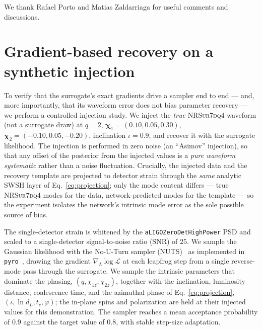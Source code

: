 \documentclass[aps,prd,twocolumn,superscriptaddress,longbibliography]{revtex4-2}
\newcommand{\NRSur}{\textsc{NRSur7dq4}}
\begin{document}
\begin{acknowledgments}
We thank Rafael Porto and Matias Zaldarriaga for useful comments and discussions.
\end{acknowledgments}

\appendix

\section{Gradient-based recovery on a synthetic injection}
\label{app:pe}

To verify that the surrogate's exact gradients drive a sampler end to end ---
and, more importantly, that its waveform error does not bias parameter
recovery --- we perform a controlled injection study. We inject the
\emph{true} \NRSur{} waveform (not a surrogate draw) at
$q=2$, $\boldsymbol{\chi}_1=(0.10,0.05,0.30)$,
$\boldsymbol{\chi}_2=(-0.10,0.05,-0.20)$, inclination $\iota=0.9$,
and recover it with the surrogate likelihood. The injection is performed in
zero noise (an ``Asimov'' injection), so that any offset of the posterior
from the injected values is a \emph{pure waveform systematic} rather than a
noise fluctuation. Crucially, the injected data and the recovery template are
projected to detector strain through the \emph{same} analytic SWSH layer of
Eq.~\eqref{eq:projection}; only the mode content differs --- true \NRSur{}
modes for the data, network-predicted modes for the template --- so the
experiment isolates the network's intrinsic mode error as the sole possible
source of bias.

The single-detector strain is whitened by the
\texttt{aLIGOZeroDetHighPower} PSD and scaled to a single-detector
signal-to-noise ratio (SNR) of $25$. We sample the Gaussian likelihood with the
No-U-Turn sampler (NUTS)~\cite{Hoffman:2014} as implemented in
\texttt{pyro}~\cite{Bingham:2019}, drawing the gradient
$\nabla_\lambda\log\mathcal{L}$ at each leapfrog step from a single
reverse-mode pass through the surrogate. We sample the intrinsic
parameters that dominate the phasing,
$(q,\chi_{1z},\chi_{2z})$, together with the inclination, luminosity
distance, coalescence time, and the azimuthal phase of
Eq.~\eqref{eq:projection},
$(\iota,\ln d_L,t_c,\varphi)$; the in-plane spins and polarization are held
at their injected values for this demonstration. The sampler reaches a mean
acceptance probability of $0.9$ against the target value of $0.8$, with stable
step-size adaptation.
\end{document}
